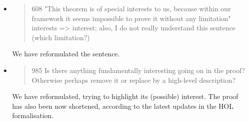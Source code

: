 \begin{itemize}



  \item \begin{quote}
608 "This theorem is of special interests to us, because within our framework it seems impossible to prove it without any limitation" interests => interest; also, I do not really understand this sentence (which limitation?)
\end{quote}
  \Mark We have reformulated the sentence. 


  \item \begin{quote}
985 Is there anything fundamentally interesting going on in the proof? Otherwise perhaps remove it or replace by a high-level description?
\end{quote}
  \Mark 
We have reformulated, trying to highlight its (possible) interest.
The proof has also been now shortened, according to the
             latest updates in the HOL formalisation.



\end{itemize}
